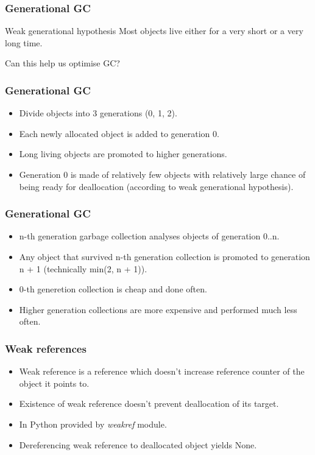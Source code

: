 \documentclass{beamer}
\begin{document}
    \begin{frame}
        \frametitle{Generational GC}
        \begin{block}{Weak generational hypothesis}
            Most objects live either for a very short or a very long time.
        \end{block}
        \vfill
        \begin{center}
            Can this help us optimise GC?
        \end{center}
    \end{frame}

    \begin{frame}
        \frametitle{Generational GC}
        \begin{itemize}
            \item Divide objects into 3 generations (0, 1, 2).
            \item Each newly allocated object is added to generation 0.
            \item Long living objects are promoted to higher generations.
            \item Generation 0 is made of relatively few objects with relatively large chance of being ready for deallocation (according to weak generational hypothesis).
        \end{itemize}
    \end{frame}

    \begin{frame}
        \frametitle{Generational GC}
        \begin{itemize}
            \item n-th generation garbage collection analyses objects of generation 0..n.
            \item Any object that survived n-th generation collection is promoted to generation n + 1 (technically min(2, n + 1)).
            \item 0-th generetion collection is cheap and done often.
            \item Higher generation collections are more expensive and performed much less often.
        \end{itemize}
    \end{frame}

    \begin{frame}
        \frametitle{Weak references}
        \begin{itemize}
            \item Weak reference is a reference which doesn't increase reference counter of the object it points to.
            \item Existence of weak reference doesn't prevent deallocation of its target.
            \item In Python provided by \textit{weakref} module.
            \item Dereferencing weak reference to deallocated object yields None.
        \end{itemize}
    \end{frame}
\end{document}
